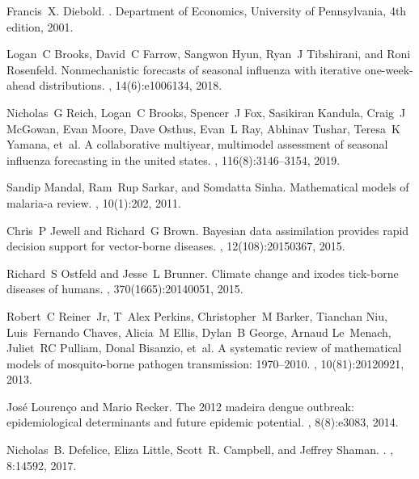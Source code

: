 \documentclass[a4paper]{article}
\begin{document}
\begin{thebibliography}{100}
Francis~X. Diebold.
.
\newblock Department of Economics, University of Pennsylvania, 4th edition,
  2001.

Logan~C Brooks, David~C Farrow, Sangwon Hyun, Ryan~J Tibshirani, and Roni
  Rosenfeld.
\newblock Nonmechanistic forecasts of seasonal influenza with iterative
  one-week-ahead distributions.
, 14(6):e1006134, 2018.

Nicholas~G Reich, Logan~C Brooks, Spencer~J Fox, Sasikiran Kandula, Craig~J
  McGowan, Evan Moore, Dave Osthus, Evan~L Ray, Abhinav Tushar, Teresa~K
  Yamana, et~al.
\newblock A collaborative multiyear, multimodel assessment of seasonal
  influenza forecasting in the united states.
,
  116(8):3146--3154, 2019.

Sandip Mandal, Ram~Rup Sarkar, and Somdatta Sinha.
\newblock Mathematical models of malaria-a review.
, 10(1):202, 2011.

Chris~P Jewell and Richard~G Brown.
\newblock Bayesian data assimilation provides rapid decision support for
  vector-borne diseases.
, 12(108):20150367, 2015.

Richard~S Ostfeld and Jesse~L Brunner.
\newblock Climate change and ixodes tick-borne diseases of humans.
, 370(1665):20140051, 2015.

Robert~C Reiner~Jr, T~Alex Perkins, Christopher~M Barker, Tianchan Niu,
  Luis~Fernando Chaves, Alicia~M Ellis, Dylan~B George, Arnaud Le~Menach,
  Juliet~RC Pulliam, Donal Bisanzio, et~al.
\newblock A systematic review of mathematical models of mosquito-borne pathogen
  transmission: 1970--2010.
, 10(81):20120921, 2013.

Jos{\'e} Louren{\c{c}}o and Mario Recker.
\newblock The 2012 madeira dengue outbreak: epidemiological determinants and
  future epidemic potential.
, 8(8):e3083, 2014.

Nicholas~B. Defelice, Eliza Little, Scott~R. Campbell, and Jeffrey Shaman.
.
, 8:14592, 2017.


\end{thebibliography}
\end{document}
